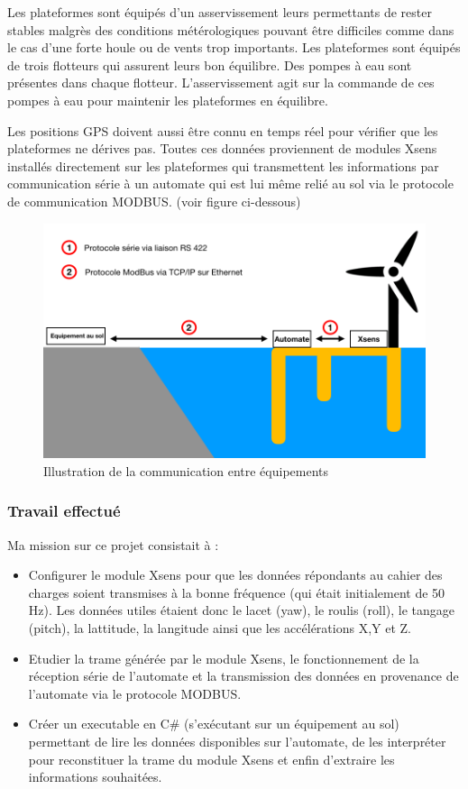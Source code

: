 Les plateformes sont équipés d'un asservissement leurs permettants de rester stables malgrès des conditions métérologiques pouvant être difficiles comme dans le cas d'une forte houle ou de vents trop importants. Les plateformes sont équipés de trois flotteurs qui assurent leurs bon équilibre. Des pompes à eau sont présentes dans chaque flotteur. L'asservissement agit sur la commande de ces pompes à eau pour maintenir les plateformes en équilibre. 

Les positions GPS doivent aussi être connu en temps réel pour vérifier que les plateformes ne dérives pas. 
Toutes ces données proviennent de modules Xsens installés directement sur les plateformes qui transmettent les informations par communication série à un automate qui est lui même relié au sol via le protocole de communication MODBUS.  (voir figure ci-dessous)
\newpage


\begin{figure}[ht]
    \centering
    \includegraphics[scale=0.45]{img/schKOWL.png}
    \caption{Illustration de la communication entre équipements }
    \label{fig:CameraCmdsettings}
\end{figure}

\subsubsection{Travail effectué}

Ma mission sur ce projet consistait à : 

\begin{itemize}
	\item Configurer le module Xsens pour que les données répondants au cahier des charges soient transmises à la bonne fréquence (qui était initialement de 50 Hz). Les données utiles étaient donc le lacet (yaw), le roulis (roll), le tangage (pitch), la lattitude, la langitude ainsi que les accélérations X,Y et Z. 
	\item Etudier la trame générée par le module Xsens, le fonctionnement de la réception série de l'automate et la transmission des données en provenance de l'automate via le protocole MODBUS. 
	\item Créer un executable en C\# (s'exécutant sur un équipement au sol) permettant de lire les données disponibles sur l'automate, de les interpréter pour reconstituer la trame du module Xsens et enfin d'extraire les informations souhaitées. 

\end{itemize}
\newpage
